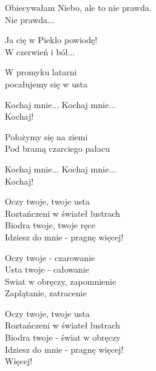\begin{text}
    Obiecywałam Niebo, ale to nie prawda.\\
    Nie prawda...

    Ja cię w Piekło powiodę!\\
    W czerwień i ból...

    W promyku latarni\\
    pocałujemy się w usta

    Kochaj mnie... Kochaj mnie...\\
    Kochaj!

    Położymy się na ziemi\\
    Pod bramą czarciego pałacu

    Kochaj mnie... Kochaj mnie...\\
    Kochaj!

    Oczy twoje, twoje usta\\
    Roztańczeni w świateł lustrach\\
    Biodra twoje, twoje ręce\\
    Idziesz do mnie - pragnę więcej!

    Oczy twoje - czarowanie\\
    Usta twoje - całowanie\\
    Swiat w obręczy, zapomnienie\\
    Zaplątanie, zatracenie

    Oczy twoje, twoje usta\\
    Roztańczeni w świateł lustrach\\
    Biodra twoje - świat w obręczy\\
    Idziesz do mnie - pragnę więcej!\\
    Więcej!
\end{text}
\begin{chord}

\end{chord}